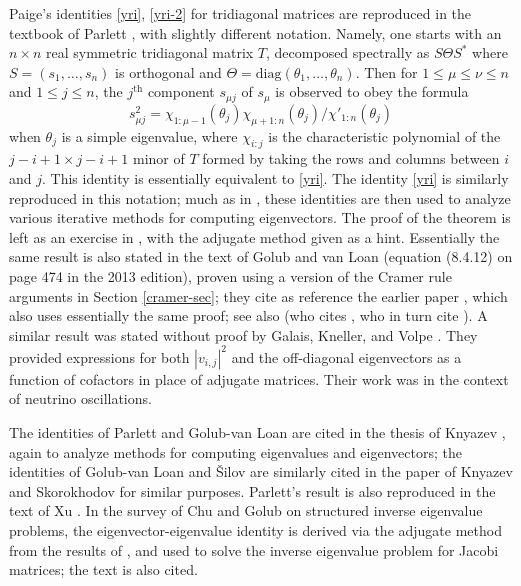 \documentclass[12pt]{amsart}
\begin{document}
Paige's identities \eqref{yri}, \eqref{yri-2} for tridiagonal matrices are reproduced in the textbook of Parlett \cite[Theorem 7.9.2]{Parlett}, with slightly different notation. Namely, one starts with an $n \times n$ real symmetric tridiagonal matrix $T$, decomposed spectrally as $S \Theta S^*$ where $S = (s_1,\dots,s_n)$ is orthogonal and $\Theta = \mathrm{diag}(\theta_1,\dots,\theta_n)$.  Then for $1 \leq \mu \leq \nu \leq n$ and $1 \leq j \leq n$, the $j^{\mathrm{th}}$ component $s_{\mu j}$ of $s_\mu$ is observed to obey the formula
$$ s_{\mu j}^2= \chi_{1:\mu-1}(\theta_j)  \chi_{\mu+1:n}(\theta_j) / \chi'_{1:n}(\theta_j)$$
when $\theta_j$ is a simple eigenvalue, where $\chi_{i:j}$ is the characteristic polynomial of the $j-i+1 \times j-i+1$ minor of $T$ formed by taking the rows and columns between $i$ and $j$. This identity is essentially equivalent to \eqref{yri}.  The identity \eqref{yri} is similarly reproduced in this notation; much as in \cite{paige_1971}, these identities are then used to analyze various iterative methods for computing eigenvectors.  The proof of the theorem is left as an exercise in \cite{Parlett}, with the adjugate method given as a hint.  Essentially the same result is also stated in the text of Golub and van Loan \cite[p. 432--433]{golub} (equation (8.4.12) on page 474 in the 2013 edition), proven using a version of the Cramer rule arguments in Section \ref{cramer-sec}; they cite as reference the earlier paper \cite[(3.6)]{golub1973}, which also uses essentially the same proof; see also \cite[(4.3.17)]{gladwell} (who cites \cite{BG}, who in turn cite \cite{golub1973}).
A similar result was stated without proof by Galais, Kneller, and Volpe \cite[Equations (6), (7)]{Galais:2011jh}.
They provided expressions for both $|v_{i,j}|^2$ and the off-diagonal eigenvectors as a function of cofactors in place of adjugate matrices.
Their work was in the context of neutrino oscillations.

The identities of Parlett and Golub-van Loan are cited in the thesis of Knyazev \cite[(2.2.27)]{knyazev}, again to analyze methods for computing eigenvalues and eigenvectors; the identities of Golub-van Loan and \v{S}ilov are similarly cited in the paper of Knyazev and Skorokhodov \cite{KS} for similar purposes. Parlett's result is also reproduced in the text of Xu \cite[(3.19)]{xu}.  In the survey \cite[(4.9)]{CG} of Chu and Golub on structured inverse eigenvalue problems, the eigenvector-eigenvalue identity is derived via the adjugate method from the results of \cite{Thompson:1968}, and used to solve the inverse eigenvalue problem for Jacobi matrices; the text \cite{Parlett} is also cited.
\end{document}
